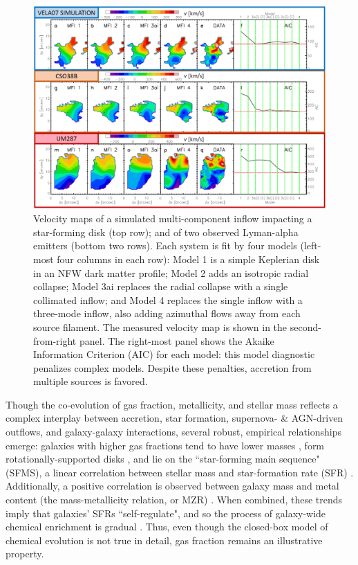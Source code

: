 \begin{figure}
    \centering
    \includegraphics[width=\textwidth]{kcwi_inflows}
    \caption[Simulations and reported observations ($z \sim 2.5$) of multi-filament inflows]{\fixspacing Velocity maps of a simulated multi-component inflow impacting a star-forming disk (top row); and of two observed Lyman-alpha emitters (bottom two rows). Each system is fit by four models (left-most four columns in each row): Model 1 is a simple Keplerian disk in an NFW dark matter profile; Model 2 adds an isotropic radial collapse; Model 3ai replaces the radial collapse with a single collimated inflow; and Model 4 replaces the single inflow with a three-mode inflow, also adding azimuthal flows away from each source filament. The measured velocity map is shown in the second-from-right panel. The right-most panel shows the Akaike Information Criterion (AIC) for each model: this model diagnostic penalizes complex models. Despite these penalties, accretion from multiple sources is favored.}
    \label{fig:kcwi_inflows}
\end{figure}

Though the co-evolution of gas fraction, metallicity, and stellar mass reflects a complex interplay between accretion, star formation, supernova- \& AGN-driven outflows, and galaxy-galaxy interactions, several robust, empirical relationships emerge: galaxies with higher gas fractions tend to have lower masses \citep{de-blok_96}, form rotationally-supported disks \citep{mcgaugh_de-blok_97}, and lie on the ``star-forming main sequence" (SFMS), a linear correlation between stellar mass and star-formation rate (SFR) \citep{brinchmann_04_sfms}. Additionally, a positive correlation is observed between galaxy mass and metal content (the mass-metallicity relation, or MZR) \citep{tremonti_mz}. When combined, these trends imply that galaxies' SFRs ``self-regulate", and so the process of galaxy-wide chemical enrichment is gradual \citep{finlator_dave_oppenheimer_12,fu_kauffmann_13}. Thus, even though the closed-box model of chemical evolution is not true in detail, gas fraction remains an illustrative property.

